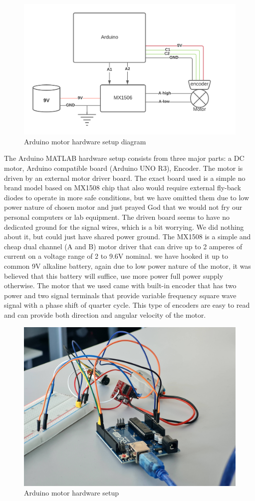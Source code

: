 \documentclass[]{final_report}
\begin{document}
\begin{figure} [h!]
\centerline{\includegraphics[width=.75\textwidth]{Screenshots for paper/arduino/model1/dc motor model1.png}}
\caption{Arduino motor hardware setup diagram}
\label{fig:arduinoMotorSetupDiagram}
\end{figure}

The Arduino MATLAB hardware setup consists from three major parts: a DC motor, Arduino compatible board (Arduino UNO R3), Encoder. The motor is driven by an external motor driver board. The exact board used is a simple no brand model based on MX1508 chip that also would require external fly-back diodes to operate in more safe conditions, but we have omitted them due to low power nature of chosen motor and just prayed God that we would not fry our personal computers or lab equipment. The driven board seems to have no dedicated ground for the signal wires, which is a bit worrying. We did nothing about it, but could just have shared power ground. The MX1508 is a simple and cheap dual channel (A and B) motor driver that can drive up to 2 amperes of current on a voltage range of 2 to 9.6V nominal. we have hooked it up to common 9V alkaline battery, again due to low power nature of the motor, it was believed that this battery will suffice, use more power full power supply otherwise. The motor that we used came with built-in encoder that has two power and two signal terminals that provide variable frequency square wave signal with a phase shift of quarter cycle. This type of encoders are easy to read and can provide both direction and angular velocity of the motor.  

\begin{figure} [h!]
\centerline{\includegraphics[width=.75\textwidth]{Screenshots for paper/arduino/arduino motor setup 1.jpg}}
\caption{Arduino motor hardware setup}
\label{fig:arduinoMotorSetup}
\end{figure}
\end{document}
